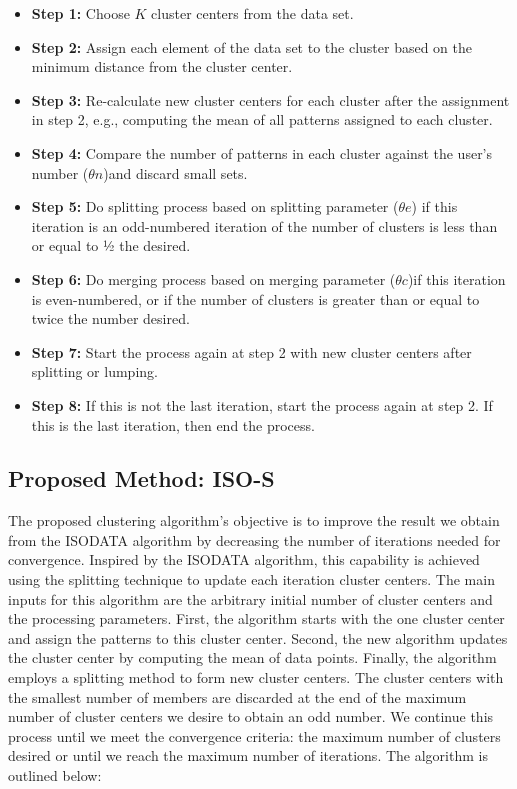 \documentclass[twoside,twocolumn]{article}
\begin{document}
\begin{itemize}
\item \textbf{Step 1:} Choose $K$ cluster centers from the data set.
\item \textbf{Step 2:} Assign each element of the data set to the cluster based
on the minimum distance from the cluster center.
\item \textbf{Step 3:} Re-calculate new cluster centers for each cluster after
the assignment in step 2, e.g., computing the mean of all patterns assigned to
each cluster.
\item \textbf{Step 4:} Compare the number of patterns in each cluster against
the user's number ($\theta n$)and discard small sets. 
\item \textbf{Step 5:} Do splitting process based on splitting parameter
($\theta e$) if this iteration is an odd-numbered iteration of the number of
clusters is less than or equal to ½ the desired.
\item \textbf{Step 6:} Do merging process based on merging parameter ($\theta
c$)if this iteration is even-numbered, or if the number of clusters is greater
than or equal to twice the number desired.
\item \textbf{Step 7:} Start the process again at step 2 with new cluster
centers after splitting or lumping.
\item \textbf{Step 8:} If this is not the last iteration, start the process
again at step 2. If this is the last iteration, then end the process.
\end{itemize}


\subsection{Proposed Method: ISO-S}
The proposed clustering algorithm's objective is to improve the result we obtain
from the ISODATA algorithm by decreasing the number of iterations needed for
convergence. Inspired by the ISODATA algorithm, this capability is achieved
using the splitting technique to update each iteration cluster centers. The main
inputs for this algorithm are the arbitrary initial number of cluster centers
and the processing parameters. First, the algorithm starts with the one cluster
center and assign the patterns to this cluster center. Second, the new algorithm
updates the cluster center by computing the mean of data points. Finally, the
algorithm employs a splitting method to form new cluster centers. The cluster
centers with the smallest number of members are discarded at the end of the
maximum number of cluster centers we desire to obtain an odd number. We continue
this process until we meet the convergence criteria: the maximum number of
clusters desired or until we reach the maximum number of iterations. The
algorithm is outlined below:
\end{document}
